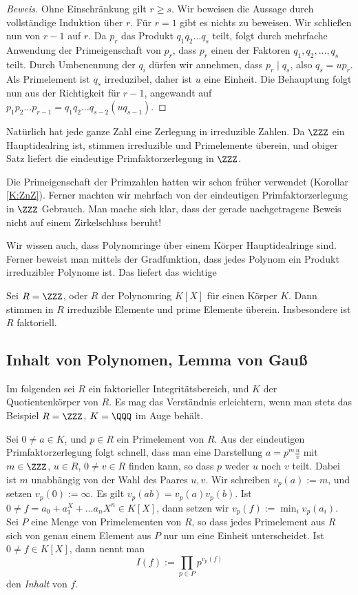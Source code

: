 \documentclass[12pt,a4paper,twoside]{article}
\newcommand{\ei}[1]{\emph{#1}\index{#1}}
\begin{document}
\begin{proof}[Beweis]
  Ohne Einschr\"ankung gilt $r\ge s$. Wir beweisen die Aussage durch
  vollst\"andige Induktion \"uber $r$. F\"ur $r=1$ gibt es nichts zu
  beweisen. Wir schlie\ss en nun von $r-1$ auf $r$. Da $p_r$ das Produkt
  $q_1q_2\dots q_s$ teilt, folgt durch mehrfache Anwendung der Primeigenschaft
  von $p_r$, dass $p_r$ einen der Faktoren $q_1,q_2,\dots,q_s$ teilt. Durch
  Umbenennung der $q_i$ d\"urfen wir annehmen, dass $p_r\mid q_s$, also
  $q_s=up_r$. Als Primelement ist $q_s$ irreduzibel, daher ist $u$ eine
  Einheit. Die Behauptung folgt nun aus der Richtigkeit f\"ur $r-1$, angewandt
  auf $p_1p_2\dots p_{r-1}=q_1q_2\dots q_{s-2}(uq_{s-1})$. 
\end{proof}
Nat\"urlich hat jede ganze Zahl eine Zerlegung in irreduzible Zahlen. Da
$\ZZZ$ ein Hauptidealring ist, stimmen irreduzible und Primelemente \"uberein,
und obiger Satz liefert die eindeutige Primfaktorzerlegung in $\ZZZ$.

Die Primeigenschaft der Primzahlen hatten wir schon fr\"uher verwendet
(Korollar \ref{K:ZnZ}). Ferner machten wir mehrfach von der eindeutigen
Primfaktorzerlegung in $\ZZZ$ Gebrauch. Man mache sich klar, dass der gerade
nachgetragene Beweis nicht auf einem Zirkelschluss beruht!

Wir wissen auch, dass Polynomringe \"uber einem K\"orper Hauptidealringe
sind. Ferner beweist man mittels der Gradfunktion, dass jedes Polynom ein
Produkt irreduzibler Polynome ist. Das liefert das wichtige
\begin{Korollar}
  Sei $R=\ZZZ$, oder $R$ der Polynomring $K[X]$ f\"ur einen K\"orper $K$. Dann
  stimmen in $R$ irreduzible Elemente und prime Elemente \"uberein.
  Insbesondere ist $R$ faktoriell.
\end{Korollar}
\subsection{Inhalt von Polynomen, Lemma von Gau\ss}
Im folgenden sei $R$ ein faktorieller Integrit\"atsbereich, und $K$ der
Quotientenk\"orper von $R$. Es mag das Verst\"andnis erleichtern, wenn man
stets das Beispiel $R=\ZZZ$, $K=\QQQ$ im Auge beh\"alt.

Sei $0\ne a\in K$, und $p\in R$ ein Primelement von $R$. Aus der eindeutigen
Primfaktorzerlegung folgt schnell, dass man eine Darstellung
$a=p^m\frac{u}{v}$ mit $m\in\ZZZ$, $u\in R$, $0\ne v\in R$ finden kann, so
dass $p$ weder $u$ noch $v$ teilt. Dabei ist $m$ unabh\"angig von der Wahl des
Paares $u,v$. Wir schreiben $v_p(a):=m$, und setzen $v_p(0):=\infty$. Es gilt
$v_p(ab)=v_p(a)v_p(b)$. Ist $0\ne f=a_0+a_1^X+\dots a_nX^n\in K[X]$, dann
setzen wir $v_p(f):=\min_iv_p(a_i)$. Sei $P$ eine Menge von Primelementen von
$R$, so dass jedes Primelement aus $R$ sich von genau einem Element aus $P$
nur um eine Einheit unterscheidet. Ist $0\ne f\in K[X]$, dann nennt man
\[
I(f):=\prod_{p\in P}p^{v_p(f)}
\]
den \ei{Inhalt} von $f$.
\end{document}
